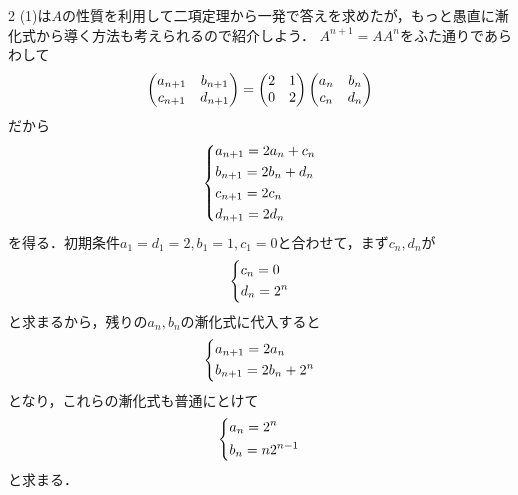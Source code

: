 \documentclass[../../main.tex]{subfiles}
\begin{document}
\begin{multicols}{2}
  (1)は$A$の性質を利用して二項定理から一発で答えを求めたが，もっと愚直に漸化式から導く方法も考えられるので紹介しよう．
  $A^{n+1}=A A^{n}$をふた通りであらわして
  \begin{align}
    \begin{pmatrix} a_{n+1} & b_{n+1} \\ c_{n+1} & d_{n+1}
    \end{pmatrix} = \mqty(2 & 1 \\ 0 & 2)
    \begin{pmatrix} a_n & b_n \\ c_n & d_n
    \end{pmatrix}
  \end{align}
  だから
  \begin{align}
    \begin{dcases}
      a_{n+1} = 2 a_{n} + c_{n} \\
      b_{n+1} = 2 b_{n} + d_{n} \\
      c_{n+1} = 2c_{n}          \\
      d_{n+1} = 2d_{n}
    \end{dcases}
  \end{align}
  を得る．初期条件$a_1=d_1=2,b_1=1,c_1=0$と合わせて，まず$c_n,d_n$が
  \begin{align}
    \begin{dcases}
      c_{n} = 0 \\
      d_{n} = 2^{n}
    \end{dcases}
  \end{align}
  と求まるから，残りの$a_n,b_n$の漸化式に代入すると
  \begin{align}
    \begin{dcases}
      a_{n+1} = 2 a_{n} \\
      b_{n+1} = 2 b_{n} + 2^{n}
    \end{dcases}
  \end{align}
  となり，これらの漸化式も普通にとけて
  \begin{align}
    \begin{dcases}
      a_n = 2^{n} \\
      b_n = n2^{n-1}
    \end{dcases}
  \end{align}
  と求まる．


\end{multicols}
\end{document}
